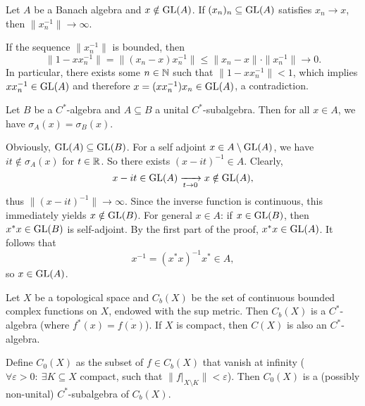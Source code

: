 \begin{lemma}
  Let $A$ be a Banach algebra and $x \notin \operatorname{GL}(A)$.
  If $(x_n)_n \subseteq \operatorname{GL}(A)$ satisfies $x_n \to x$, then $\|x_n ^{-1}\| \to \infty$.
\end{lemma}

\begin{myproof}
  If the sequence $\|x_n^{-1}\|$ is bounded, then 
  $$\| 1 - x x_n^{-1}\| = \| (x_n - x) x_n^{-1}\| \leq \| x_n - x\| \cdot \|x_n^{-1}\| \to 0.$$
  In particular, there exists some $n \in \mathbb {N}$ such that $\| 1 - xx_n^{-1}\| < 1$,
  which implies $x x_n^{-1} \in \operatorname{GL} (A)$ and therefore $x = (x x_n^{-1}) x_n \in \operatorname{GL}(A)$, a contradiction.
\end{myproof}

\begin{proposition}
  Let $B$ be a $C^*$-algebra and $A \subseteq B$ a unital $C^*$-subalgebra.
  Then for all $x \in A$, we have $\sigma_A (x) = \sigma_B (x)$.
\end{proposition}

\begin{myproof}
  Obviously, $\operatorname{GL} (A) \subseteq \operatorname{GL}(B)$. For a self adjoint $x \in A \setminus \operatorname{GL}(A)$, we have
  $it \notin \sigma_A (x)$ for $t \in \mathbb {R}$. So there exists $(x - it)^{-1} \in A$.
  Clearly, $$x - it \in \operatorname{GL}(A) \xrightarrow[t \to 0]{} x \notin \operatorname{GL}(A),$$
  thus $\| (x - it)^{-1}\| \to \infty$. Since the inverse function is continuous,
  this immediately yields $x \notin \operatorname{GL} (B)$.
  For general $x \in A$: if $x \in \operatorname{GL}(B)$, then $x^* x \in \operatorname{GL}(B)$ 
  is self-adjoint. By the first part of the proof, $x^* x \in \operatorname{GL}(A)$.
  It follows that 
  \begin{equation*}
    x^{-1} = (x^* x)^{-1} x^* \in A,
  \end{equation*}
  so $x \in \operatorname{GL}(A)$.
\end{myproof}

\begin{example}
  Let $X$ be a topological space and $C_b (X)$ be the set of continuous bounded complex functions on $X$,
  endowed with the sup metric. Then $C_b (X)$ is a $C^*$-algebra (where $f^*(x) = \overline{f(x)}$).
  If $X$ is compact, then $C(X)$ is also an $C^*$-algebra.
\end{example}

\begin{example}
  Define $C_0 (X)$ as the subset of $f \in C_b (X)$
  that vanish at infinity ($\forall \varepsilon > 0:\ \exists K \subseteq X$ compact, such that $\|f\big|_{X \setminus K}\| < \varepsilon$).
  Then $C_0 (X)$ is a (possibly non-unital) $C^*$-subalgebra of $C_b (X)$. 
\end{example}


